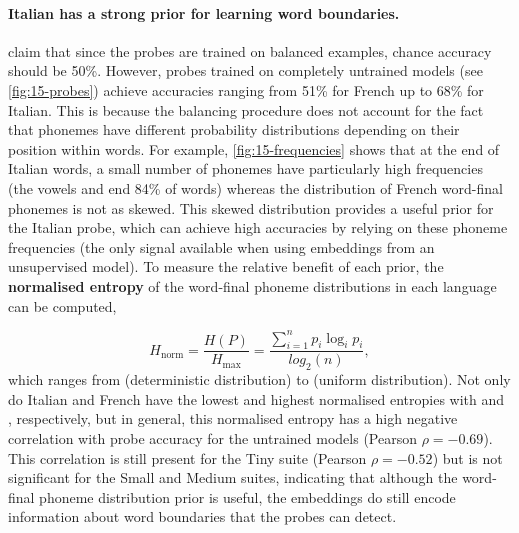 \paragraph{Italian has a strong prior for learning word boundaries.}
\citet{hahn-baroni-2019-tabula} claim that since the probes are trained on balanced examples,
chance accuracy should be 50\%. However, probes trained on completely untrained models (see \cref{fig:15-probes}) achieve accuracies ranging from 51\% for French up to 68\% for Italian. This is because the balancing procedure does not account for the fact that phonemes have different probability distributions depending on their position within words. For example, \cref{fig:15-frequencies} shows that at the end of Italian words, a small number of phonemes have particularly high frequencies (the vowels  and  end 84\% of words) whereas the distribution of French word-final phonemes is not as skewed. This skewed distribution provides a useful prior for the Italian probe, which can achieve high accuracies by relying on these phoneme frequencies (the only signal available when using embeddings from an unsupervised model). To measure the relative benefit of each prior, the \textbf{normalised entropy} of the word-final phoneme distributions in each language can be computed, 

$$H_\mathrm{norm}=\frac{H(P)}{H_\mathrm{max}} = \frac{\sum_{i=1}^np_i\log_ip_i}{log_2(n)},$$ 
which ranges from  (deterministic distribution) to  (uniform distribution). Not only do Italian and French have the lowest and highest normalised entropies with  and , respectively, but in general, this normalised entropy has a high negative correlation with probe accuracy for the untrained models (Pearson $\rho = -0.69$). This correlation is still present for the Tiny suite (Pearson $\rho = -0.52$) but is not significant for the Small and Medium suites, indicating that although the word-final phoneme distribution prior is useful, the embeddings do still encode information about word boundaries that the probes can detect.


